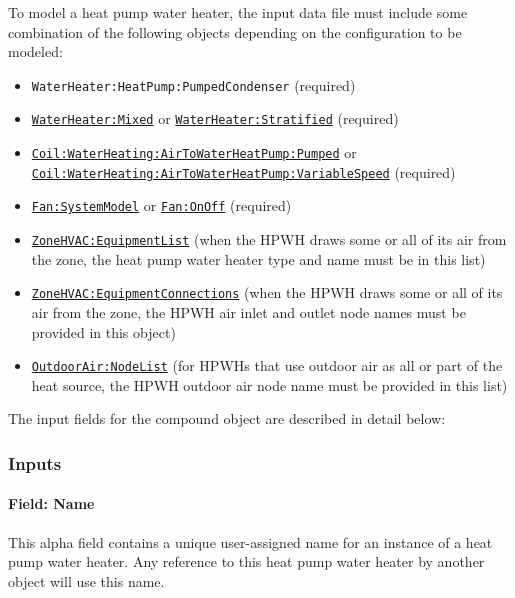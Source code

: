 To model a heat pump water heater, the input data file must include some combination of the following objects depending on the configuration to be modeled:

\begin{itemize}
\item
  \lstinline!WaterHeater:HeatPump:PumpedCondenser! (required)
\item
   \hyperref[waterheatermixed]{\lstinline!WaterHeater:Mixed!} or \hyperref[waterheaterstratified]{\lstinline!WaterHeater:Stratified!} (required)
\item
  \hyperref[coilwaterheatingairtowaterheatpumppumped]{\lstinline!Coil:WaterHeating:AirToWaterHeatPump:Pumped!} or \hyperref[coil-waterheating-airtowaterheatpump-variablespeed]{\lstinline!Coil:WaterHeating:AirToWaterHeatPump:VariableSpeed!} (required)
\item
  \hyperref[fansystemmodel]{\lstinline!Fan:SystemModel!} or \hyperref[fanonoff]{\lstinline!Fan:OnOff!} (required)
\item
  \hyperref[zonehvacequipmentlist]{\lstinline!ZoneHVAC:EquipmentList!} (when the HPWH draws some or all of its air from the zone, the heat pump water heater type and name must be in this list)
\item
  \hyperref[zonehvacequipmentconnections]{\lstinline!ZoneHVAC:EquipmentConnections!} (when the HPWH draws some or all of its air from the zone, the HPWH air inlet and outlet node names must be provided in this object)
\item
  \hyperref[outdoorairnodelist]{\lstinline!OutdoorAir:NodeList!} (for HPWHs that use outdoor air as all or part of the heat source, the HPWH outdoor air node name must be provided in this list)
\end{itemize}

The input fields for the compound object are described in detail below:

\subsubsection{Inputs}\label{inputs-3-040}

\paragraph{Field: Name}\label{field-name-2-042}

This alpha field contains a unique user-assigned name for an instance of a heat pump water heater. Any reference to this heat pump water heater by another object will use this name.

